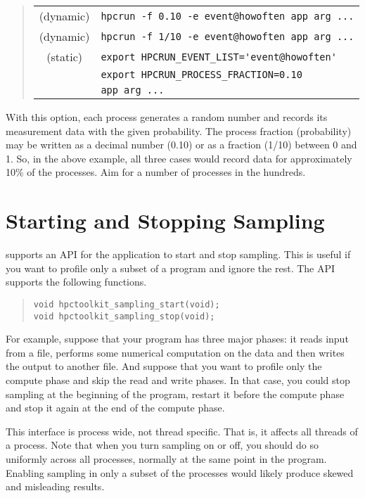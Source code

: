 \begin{quote}
\begin{tabular}{@{}cl}
(dynamic) & \verb|hpcrun -f 0.10 -e event@howoften app arg ...| \\
(dynamic) & \verb|hpcrun -f 1/10 -e event@howoften app arg ...| \\
(static)  & \verb|export HPCRUN_EVENT_LIST='event@howoften'| \\
& \verb|export HPCRUN_PROCESS_FRACTION=0.10| \\
& \verb|app arg ...|
\end{tabular}
\end{quote}

With this option, each process generates a random number and records
its measurement data with the given probability.  The process fraction
(probability) may be written as a decimal number (0.10) or as a
fraction (1/10) between 0 and 1.  So, in the above example, all three
cases would record data for approximately 10\% of the processes.  Aim
for a number of processes in the hundreds.


\section{Starting and Stopping Sampling}

\HPCToolkit{} supports an API for the application to start and stop
sampling.  This is useful if you want to profile only a subset of a
program and ignore the rest.  The API supports the following
functions.

\begin{quote}
\begin{verbatim}
void hpctoolkit_sampling_start(void);
void hpctoolkit_sampling_stop(void);
\end{verbatim}
\end{quote}

For example, suppose that your program has three major phases: it
reads input from a file, performs some numerical computation on the
data and then writes the output to another file.  And suppose that you
want to profile only the compute phase and skip the read and write
phases.  In that case, you could stop sampling at the beginning of the
program, restart it before the compute phase and stop it again at the
end of the compute phase.

This interface is process wide, not thread specific.  That is, it
affects all threads of a process.  Note that when you turn sampling on
or off, you should do so uniformly across all processes, normally at
the same point in the program.  Enabling sampling in only a subset of
the processes would likely produce skewed and misleading results.

